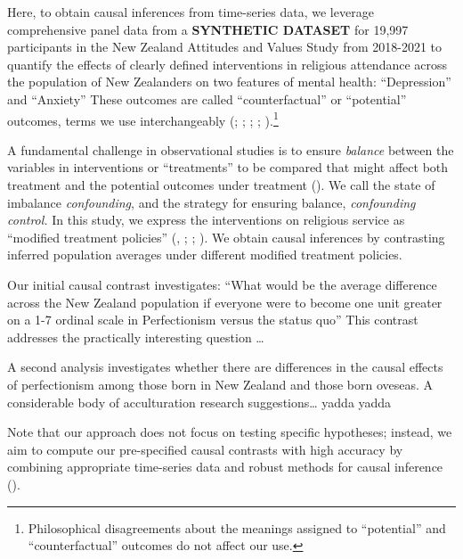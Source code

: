 \documentclass[
  single column]{article}
\begin{document}
Here, to obtain causal inferences from time-series data, we leverage
comprehensive panel data from a \textbf{SYNTHETIC DATASET} for 19,997
participants in the New Zealand Attitudes and Values Study from
2018-2021 to quantify the effects of clearly defined interventions in
religious attendance across the population of New Zealanders on two
features of mental health: ``Depression'' and ``Anxiety'' These outcomes
are called ``counterfactual'' or ``potential'' outcomes, terms we use
interchangeably (;
; ; ;
).\footnote{Philosophical
  disagreements about the meanings assigned to ``potential'' and
  ``counterfactual'' outcomes do not affect our use.}

A fundamental challenge in observational studies is to ensure
\emph{balance} between the variables in interventions or ``treatments''
to be compared that might affect both treatment and the potential
outcomes under treatment (). We call the state of imbalance \emph{confounding}, and
the strategy for ensuring balance, \emph{confounding control.} In this
study, we express the interventions on religious service as ``modified
treatment policies'' (, ;
;
). We obtain
causal inferences by contrasting inferred population averages under
different modified treatment policies.

Our initial causal contrast investigates: ``What would be the average
difference across the New Zealand population if everyone were to become
one unit greater on a 1-7 ordinal scale in Perfectionism versus the
status quo'' This contrast addresses the practically interesting
question \ldots{}

A second analysis investigates whether there are differences in the
causal effects of perfectionism among those born in New Zealand and
those born oveseas. A considerable body of acculturation research
suggestions\ldots{} yadda yadda

Note that our approach does not focus on testing specific hypotheses;
instead, we aim to compute our pre-specified causal contrasts with high
accuracy by combining appropriate time-series data and robust methods
for causal inference ().
\end{document}
